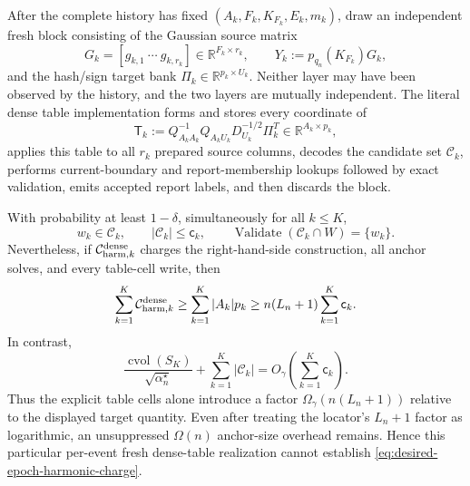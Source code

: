 \begin{proposition}
After the complete history has fixed
$(A_k,F_k,K_{F_k},E_k,m_k)$, draw an independent fresh block consisting of
the Gaussian source matrix
\begin{equation*}
 G_k=[g_{k,1}\ \cdots\ g_{k,r_k}]
 \in\mathbb R^{F_k\times r_k},
 \qquad
 Y_k:=p_{q_n}(K_{F_k})G_k,
\end{equation*}
and the hash/sign target bank
$\Pi_k\in\mathbb R^{p_k\times U_k}$.  Neither layer may have been observed by
the history, and the two layers are mutually independent.  The literal dense
table implementation forms and stores every coordinate of
\begin{equation}
 \mathsf T_k
 :=Q_{A_kA_k}^{-1}Q_{A_kU_k}D_{U_k}^{-1/2}\Pi_k^T
 \in\mathbb R^{A_k\times p_k},
 \label{eq:notched-sun-fresh-dense-harmonic-table}
\end{equation}
applies this table to all $r_k$ prepared source columns, decodes the candidate
set $\mathcal C_k$, performs current-boundary and report-membership lookups
followed by exact validation, emits accepted report labels, and then discards
the block.

With probability at least $1-\delta$, simultaneously for all $k\leq K$,
\begin{equation}
 w_k\in\mathcal C_k,
 \qquad
 |\mathcal C_k|\leq\mathsf c_k,
 \qquad
 \operatorname{Validate}(\mathcal C_k\cap W)=\{w_k\}.
 \label{eq:notched-sun-fresh-table-correctness}
\end{equation}
Nevertheless, if $\mathcal C_{{\rm harm},k}^{\rm dense}$ charges the
right-hand-side construction, all anchor solves, and every table-cell write,
then
\begin{equation}
 \sum_{k=1}^K\mathcal C_{{\rm harm},k}^{\rm dense}
 \geq\sum_{k=1}^K|A_k|p_k
 \geq n(L_n+1)\sum_{k=1}^K\mathsf c_k.
 \label{eq:notched-sun-fresh-table-write-lower-bound}
\end{equation}
In contrast,
\begin{equation}
 \frac{\operatorname{cvol}(S_K)}{\sqrt{\alpha_n^\star}}
 +\sum_{k=1}^K|\mathcal C_k|
 =O_\gamma\!\left(\sum_{k=1}^K\mathsf c_k\right).
 \label{eq:notched-sun-fresh-table-target-upper-bound}
\end{equation}
Thus the explicit table cells alone introduce a factor
$\Omega_\gamma(n(L_n+1))$ relative to the displayed target quantity.  Even
after treating the locator's $L_n+1$ factor as logarithmic, an unsuppressed
$\Omega(n)$ anchor-size overhead remains.  Hence this particular per-event
fresh dense-table realization cannot establish
\cref{eq:desired-epoch-harmonic-charge}.
\end{proposition}

